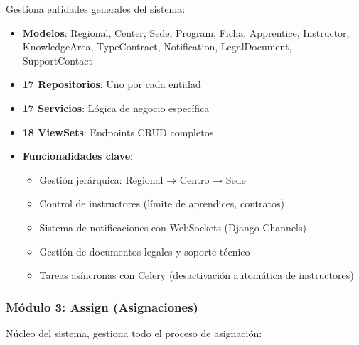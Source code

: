 Gestiona entidades generales del sistema:

\begin{itemize}
    \item \textbf{Modelos}: Regional, Center, Sede, Program, Ficha, Apprentice, Instructor, KnowledgeArea, TypeContract, Notification, LegalDocument, SupportContact
    \item \textbf{17 Repositorios}: Uno por cada entidad
    \item \textbf{17 Servicios}: Lógica de negocio específica
    \item \textbf{18 ViewSets}: Endpoints CRUD completos
    \item \textbf{Funcionalidades clave}:
    \begin{itemize}
        \item Gestión jerárquica: Regional → Centro → Sede
        \item Control de instructores (límite de aprendices, contratos)
        \item Sistema de notificaciones con WebSockets (Django Channels)
        \item Gestión de documentos legales y soporte técnico
        \item Tareas asíncronas con Celery (desactivación automática de instructores)
    \end{itemize}
\end{itemize}

\subsubsection{Módulo 3: Assign (Asignaciones)}

Núcleo del sistema, gestiona todo el proceso de asignación:


